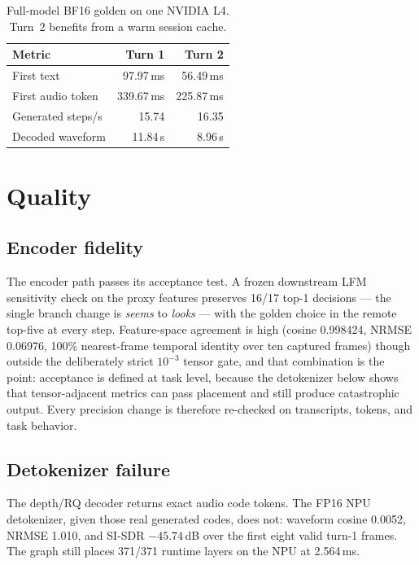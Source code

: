 \documentclass[10pt,twocolumn,letterpaper]{article}
\begin{document}
\begin{table}[t]
\centering
\small
\caption{Full-model BF16 golden on one NVIDIA L4. Turn~2 benefits from a warm
session cache.}
\label{tab:golden}
\begin{tabular}{@{}lrr@{}}
\toprule
\textbf{Metric} & \textbf{Turn 1} & \textbf{Turn 2} \\
\midrule
First text & 97.97\,ms & 56.49\,ms \\
First audio token & 339.67\,ms & 225.87\,ms \\
Generated steps/s & 15.74 & 16.35 \\
Decoded waveform & 11.84\,s & 8.96\,s \\
\bottomrule
\end{tabular}
\end{table}

\section{Quality}
\label{sec:quality}

\subsection{Encoder fidelity}

The encoder path passes its acceptance test. A frozen downstream LFM
sensitivity check on the proxy features preserves 16/17 top-1 decisions ---
the single branch change is \emph{seems} to \emph{looks} --- with the golden
choice in the remote top-five at every step. Feature-space agreement is high
(cosine 0.998424, NRMSE 0.06976, 100\% nearest-frame temporal identity over
ten captured frames) though outside the deliberately strict $10^{-3}$ tensor
gate, and that combination is the point: acceptance is defined at task level,
because the detokenizer below shows that tensor-adjacent metrics can pass
placement and still produce catastrophic output. Every precision change is
therefore re-checked on transcripts, tokens, and task behavior.

\subsection{Detokenizer failure}

The depth/RQ decoder returns exact audio code tokens. The FP16 NPU
detokenizer, given those real generated codes, does not: waveform cosine
0.0052, NRMSE 1.010, and SI-SDR $-45.74$\,dB over the first eight valid
turn-1 frames. The graph still places 371/371 runtime layers on the NPU at
2.564\,ms.
\end{document}
